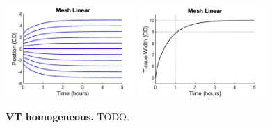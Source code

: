 \documentclass[12pt]{article}
\begin{document}
\begin{figure}[h]
%
\vspace{-0.5cm}
\begin{center}
\includegraphics[width=4.9cm, trim={0.0cm 0.0cm 0.0cm 0.0cm}, clip]{Figs/Test02aMonolayerGrowth1dChainHomogeneousChainMesh_Linear.png}
\includegraphics[width=4.9cm, trim={0.0cm 0.0cm 0.0cm 0.0cm}, clip]{Figs/Test02aMonolayerGrowth1dChainHomogeneousChainMesh_LinearWidth}
\end{center}
\vspace{-0.5cm}
\caption{{\bf VT homogeneous.} 
	TODO. }
\label{fig:todo}
\end{figure}
\end{document}
